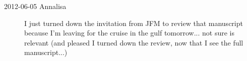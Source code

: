 \begin{description}
\item[2012-06-05 Annalisa] I just turned down the invitation from JFM to
review that manuscript because I'm leaving for the cruise in the gulf
tomorrow... not sure is relevant (and pleased I turned down the
review, now that I see the full manuscript...)

\end{description}

